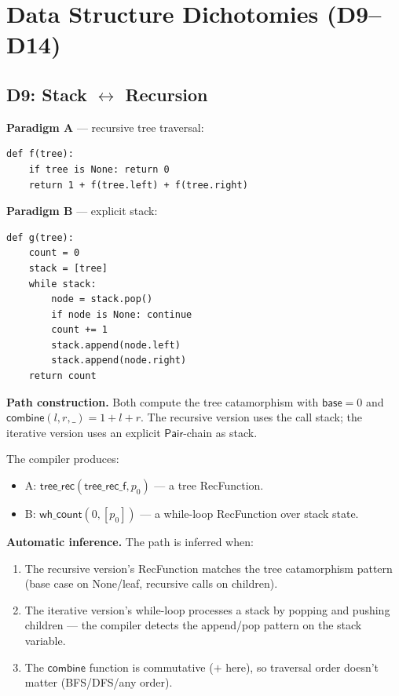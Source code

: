 \chapter{Data Structure Dichotomies (D9--D14)}
\label{ch:ds-dichotomies}

\section{D9: Stack $\leftrightarrow$ Recursion}

\textbf{Paradigm A} --- recursive tree traversal:
\begin{lstlisting}
def f(tree):
    if tree is None: return 0
    return 1 + f(tree.left) + f(tree.right)
\end{lstlisting}

\textbf{Paradigm B} --- explicit stack:
\begin{lstlisting}
def g(tree):
    count = 0
    stack = [tree]
    while stack:
        node = stack.pop()
        if node is None: continue
        count += 1
        stack.append(node.left)
        stack.append(node.right)
    return count
\end{lstlisting}

\textbf{Path construction.}
Both compute the tree catamorphism with $\mathsf{base} = 0$ and
$\mathsf{combine}(l, r, \_) = 1 + l + r$.  The recursive version
uses the call stack; the iterative version uses an explicit
$\mathsf{Pair}$-chain as stack.

The compiler produces:
\begin{itemize}
  \item A: $\mathsf{tree\_rec}(\mathsf{tree\_rec\_f}, p_0)$ ---
    a tree RecFunction.
  \item B: $\mathsf{wh\_count}(0, [p_0])$ --- a while-loop RecFunction
    over stack state.
\end{itemize}

\textbf{Automatic inference.}
The path is inferred when:
\begin{enumerate}
  \item The recursive version's RecFunction matches the tree
    catamorphism pattern (base case on None/leaf, recursive calls
    on children).
  \item The iterative version's while-loop processes a stack by
    popping and pushing children --- the compiler detects the
    append/pop pattern on the stack variable.
  \item The $\mathsf{combine}$ function is commutative ($+$ here),
    so traversal order doesn't matter (BFS/DFS/any order).
\end{enumerate}

